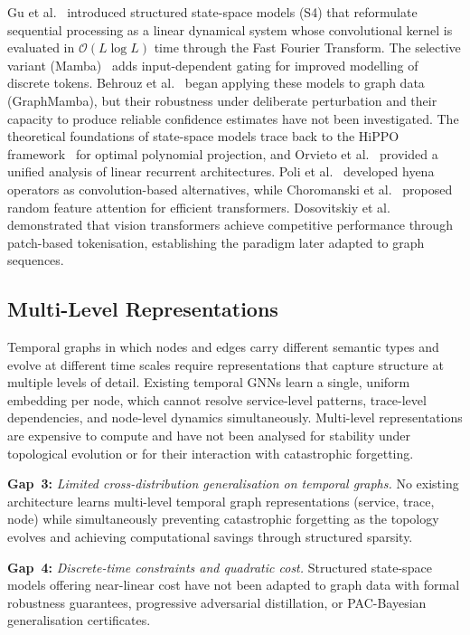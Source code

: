 Gu et al.~\cite{Gu2022} introduced structured state-space models (S4) that reformulate sequential processing as a linear dynamical system whose convolutional kernel is evaluated in $\mathcal{O}(L\log L)$ time through the Fast Fourier Transform. The selective variant (Mamba)~\cite{Dao2024} adds input-dependent gating for improved modelling of discrete tokens. Behrouz et al.~\cite{Behrouz2024graphmamba} began applying these models to graph data (GraphMamba), but their robustness under deliberate perturbation and their capacity to produce reliable confidence estimates have not been investigated. The theoretical foundations of state-space models trace back to the HiPPO framework~\cite{Gu2020hippo} for optimal polynomial projection, and Orvieto et al.~\cite{Orvieto2023} provided a unified analysis of linear recurrent architectures. Poli et al.~\cite{Poli2023} developed hyena operators as convolution-based alternatives, while Choromanski et al.~\cite{Choromanski2021,Perez2021} proposed random feature attention for efficient transformers. Dosovitskiy et al.~\cite{Dosovitskiy2021,Salvi2024} demonstrated that vision transformers achieve competitive performance through patch-based tokenisation, establishing the paradigm later adapted to graph sequences.


\subsection{Multi-Level Representations}

Temporal graphs in which nodes and edges carry different semantic types and evolve at different time scales require representations that capture structure at multiple levels of detail. Existing temporal GNNs learn a single, uniform embedding per node, which cannot resolve service-level patterns, trace-level dependencies, and node-level dynamics simultaneously. Multi-level representations are expensive to compute and have not been analysed for stability under topological evolution or for their interaction with catastrophic forgetting.

\medskip
\noindent\textbf{Gap~3:} \emph{Limited cross-distribution generalisation on temporal graphs.} No existing architecture learns multi-level temporal graph representations (service, trace, node) while simultaneously preventing catastrophic forgetting as the topology evolves and achieving computational savings through structured sparsity.

\medskip
\noindent\textbf{Gap~4:} \emph{Discrete-time constraints and quadratic cost.} Structured state-space models offering near-linear cost have not been adapted to graph data with formal robustness guarantees, progressive adversarial distillation, or PAC-Bayesian generalisation certificates.

